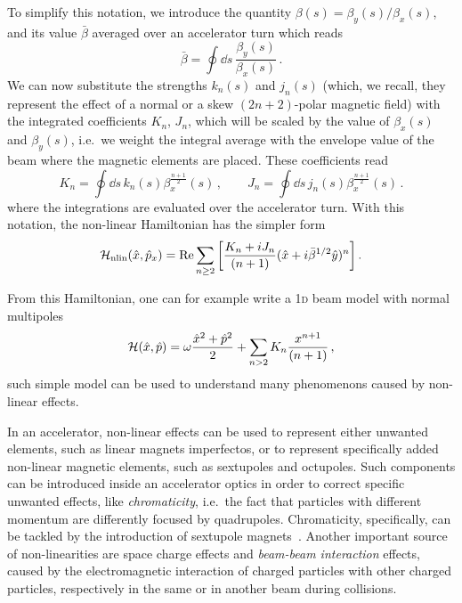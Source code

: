 To simplify this notation, we introduce the quantity $\beta(s)=\beta_y(s)/\beta_x(s)$, and its value $\bar\beta$ averaged over an accelerator turn which reads
\begin{equation}
    \bar\beta = \oint \dd s\, \frac{\beta_y(s)}{\beta_x(s)} \,.
\end{equation}
We can now substitute the strengths $k_n(s)$ and $j_n(s)$ (which, we recall, they represent the effect of a normal or a skew $(2n+2)$-polar magnetic field) with the integrated coefficients $K_n$, $J_n$, which will be scaled by the value of $\beta_x(s)$ and $\beta_y(s)$, i.e.\ we weight the integral average with the envelope value of the beam where the magnetic elements are placed. These coefficients read
%
\begin{equation} 
	K_n = \oint \dd s\, k_n(s) \beta_x^{\frac{n+1}{2}}(s)\,,\qquad
	J_n = \oint \dd s\, j_n(s) \beta_x^{\frac{n+1}{2}}(s)\,.
\end{equation} 
%
where the integrations are evaluated over the accelerator turn. With this notation, the non-linear Hamiltonian has the simpler form
% 
\begin{equation} \mathcal{H}_\text{nlin}(\hat x, \hat p_x) = \Re \sum_{n\ge 2} \qty[\frac{K_n + iJ_n}{(n+1)} (\hat x + i\bar\beta^{1/2} \hat y)^n]\,.\end{equation}

From this Hamiltonian, one can for example write a 1\textsc{d} beam model with normal multipoles
\begin{equation}
	\mathcal{H}(\hat x,\hat p) = \omega \frac{\hat x^2 + \hat p^2}{2} + \sum_{n>2} K_n \frac{x^{n+1}}{(n+1)}\, ,
	\label{eq:hamxp_nl}
\end{equation}
such simple model can be used to understand many phenomenons caused by non-linear effects.

In an accelerator, non-linear effects can be used to represent either unwanted elements, such as linear magnets imperfectos, or to represent specifically added non-linear magnetic elements, such as sextupoles and octupoles. Such components can be introduced inside an accelerator optics in order to correct specific unwanted effects, like \textit{chromaticity}, i.e.\ the fact that particles with different momentum are differently focused by quadrupoles. Chromaticity, specifically, can be tackled by the introduction of sextupole magnets~\cite{}. Another important source of non-linearities are space charge effects and \textit{beam-beam interaction} effects, caused by the electromagnetic interaction of charged particles with other charged particles, respectively in the same or in another beam during collisions.

